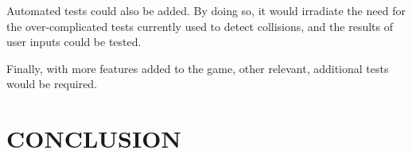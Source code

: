 \documentclass[10pt,twocolumn]{witseiepaper}
\begin{document}
Automated tests could also be added. By doing so, it would irradiate the need for the over-complicated tests currently used to detect collisions, and the results of user inputs could be tested.

Finally, with more features added to the game, other relevant, additional tests would be required.


\section{CONCLUSION}

%



\end{document}
